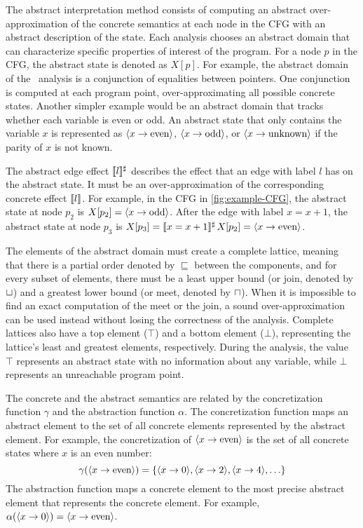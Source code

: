 The abstract interpretation method consists of computing an abstract over-approximation of the concrete semantics at each node in the CFG with an abstract description of the state.
Each analysis chooses an abstract domain that can characterize specific properties of interest of the program.
For a node $p$ in the CFG, the abstract state is denoted as $X[p]$.
For example, the abstract domain of the \cpo\ analysis is a conjunction of equalities between pointers.
One conjunction is computed at each program point, over-approximating all possible concrete states.
Another simpler example would be an abstract domain that tracks whether each variable is even or odd.
An abstract state that only contains the variable $x$ is represented as $\langle x \rightarrow \text{even}\rangle$, $\langle x \rightarrow \text{odd}\rangle$,  or $\langle x \rightarrow \text{unknown}\rangle$ if the parity of $x$ is not known.

The abstract edge effect $\llbracket l\rrbracket^\sharp$ describes the effect that an edge with label $l$ has on the abstract state.
It must be an over-approximation of the corresponding concrete effect $\llbracket l\rrbracket$.
For example, in the CFG in \cref{fig:example-CFG}, the abstract state at node $p_2$ is $X[p_2] = \langle x \rightarrow \text{odd}\rangle$.
After the edge with label $x = x+1$, the abstract state at node $p_3$ is $X[p_3] = \llbracket x = x+1\rrbracket^\sharp\,X[p_2] = \langle x \rightarrow \text{even}\rangle$.

The elements of the abstract domain must create a complete lattice, meaning that there is a partial order denoted by $\sqsubseteq$ between the components, and for every subset of elements, there must be a least upper bound (or join, denoted by $\sqcup$) and a greatest lower bound (or meet, denoted by $\sqcap$).
When it is impossible to find an exact computation of the meet or the join, a sound over-approximation can be used instead without losing the correctness of the analysis.
Complete lattices also have a top element ($\top$) and a bottom element ($\bot$), representing the lattice's least and greatest elements, respectively.
During the analysis, the value $\top$ represents an abstract state with no information about any variable, while $\bot$ represents an unreachable program point.

The concrete and the abstract semantics are related by the concretization function $\gamma$ and the abstraction function $\alpha$.
The concretization function maps an abstract element to the set of all concrete elements represented by the abstract element.
For example, the concretization of $\langle x \rightarrow \text{even}\rangle$ is the set of all concrete states where $x$ is an even number:
\[
  \gamma(\langle x \rightarrow \text{even}\rangle) = \{\langle x \rightarrow 0\rangle, \langle x \rightarrow 2\rangle, \langle x \rightarrow 4\rangle,\ldots\}
\]
The abstraction function maps a concrete element to the most precise abstract element that represents the concrete element. For example, $\alpha(\langle x \rightarrow 0\rangle) = \langle x \rightarrow \text{even}\rangle$.

